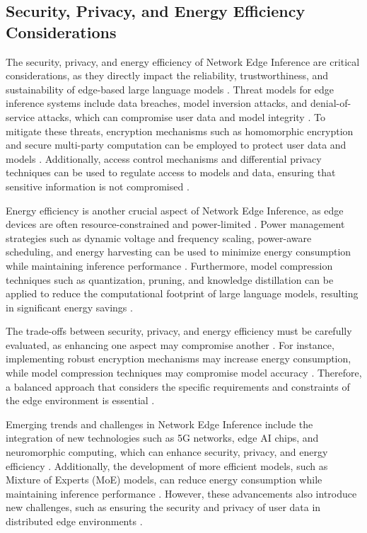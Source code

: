 \documentclass[11pt,a4paper]{article}
\begin{document}
\subsection{Security, Privacy, and Energy Efficiency Considerations}


The security, privacy, and energy efficiency of Network Edge Inference are critical considerations, as they directly impact the reliability, trustworthiness, and sustainability of edge-based large language models \cite{arxiv:2502.11880}. Threat models for edge inference systems include data breaches, model inversion attacks, and denial-of-service attacks, which can compromise user data and model integrity \cite{doi:10.1109/compsac61105.2024.00206}. To mitigate these threats, encryption mechanisms such as homomorphic encryption and secure multi-party computation can be employed to protect user data and models \cite{doi:10.1109/sp61157.2025.00182}. Additionally, access control mechanisms and differential privacy techniques can be used to regulate access to models and data, ensuring that sensitive information is not compromised \cite{arxiv:2502.11349}.

Energy efficiency is another crucial aspect of Network Edge Inference, as edge devices are often resource-constrained and power-limited \cite{doi:10.1145/3788870}. Power management strategies such as dynamic voltage and frequency scaling, power-aware scheduling, and energy harvesting can be used to minimize energy consumption while maintaining inference performance \cite{arxiv:2406.06282}. Furthermore, model compression techniques such as quantization, pruning, and knowledge distillation can be applied to reduce the computational footprint of large language models, resulting in significant energy savings \cite{arxiv:2412.15304}.

The trade-offs between security, privacy, and energy efficiency must be carefully evaluated, as enhancing one aspect may compromise another \cite{doi:10.54097/jcb63r28}. For instance, implementing robust encryption mechanisms may increase energy consumption, while model compression techniques may compromise model accuracy \cite{doi:10.1145/3701997}. Therefore, a balanced approach that considers the specific requirements and constraints of the edge environment is essential \cite{arxiv:2601.11652}.

Emerging trends and challenges in Network Edge Inference include the integration of new technologies such as 5G networks, edge AI chips, and neuromorphic computing, which can enhance security, privacy, and energy efficiency \cite{doi:10.1109/vtc2024-spring62846.2024.10683177}. Additionally, the development of more efficient models, such as Mixture of Experts (MoE) models, can reduce energy consumption while maintaining inference performance \cite{doi:10.1145/3676536.3676741}. However, these advancements also introduce new challenges, such as ensuring the security and privacy of user data in distributed edge environments \cite{arxiv:2512.16349}.
\end{document}
